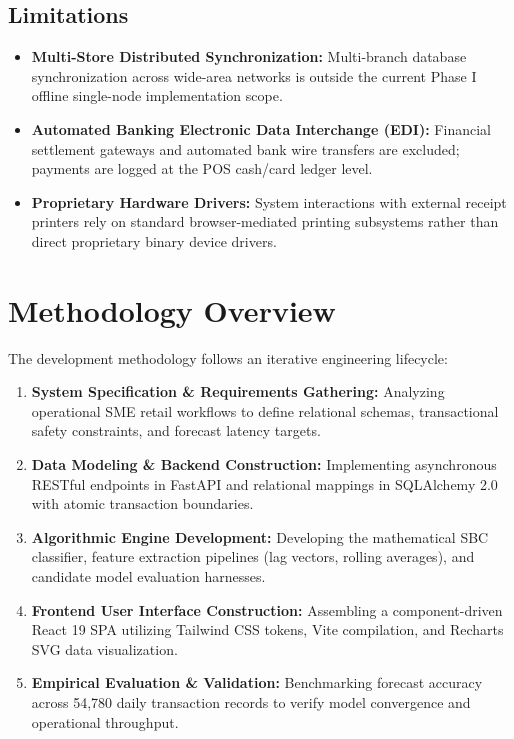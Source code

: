 \subsection{Limitations}
\begin{itemize}
    \item \textbf{Multi-Store Distributed Synchronization:} Multi-branch database synchronization across wide-area networks is outside the current Phase I offline single-node implementation scope.
    \item \textbf{Automated Banking Electronic Data Interchange (EDI):} Financial settlement gateways and automated bank wire transfers are excluded; payments are logged at the POS cash/card ledger level.
    \item \textbf{Proprietary Hardware Drivers:} System interactions with external receipt printers rely on standard browser-mediated printing subsystems rather than direct proprietary binary device drivers.
\end{itemize}

\section{Methodology Overview}
The development methodology follows an iterative engineering lifecycle:
\begin{enumerate}
    \item \textbf{System Specification \& Requirements Gathering:} Analyzing operational SME retail workflows to define relational schemas, transactional safety constraints, and forecast latency targets.
    \item \textbf{Data Modeling \& Backend Construction:} Implementing asynchronous RESTful endpoints in FastAPI and relational mappings in SQLAlchemy 2.0 with atomic transaction boundaries.
    \item \textbf{Algorithmic Engine Development:} Developing the mathematical SBC classifier, feature extraction pipelines (lag vectors, rolling averages), and candidate model evaluation harnesses.
    \item \textbf{Frontend User Interface Construction:} Assembling a component-driven React 19 SPA utilizing Tailwind CSS tokens, Vite compilation, and Recharts SVG data visualization.
    \item \textbf{Empirical Evaluation \& Validation:} Benchmarking forecast accuracy across 54,780 daily transaction records to verify model convergence and operational throughput.
\end{enumerate}

